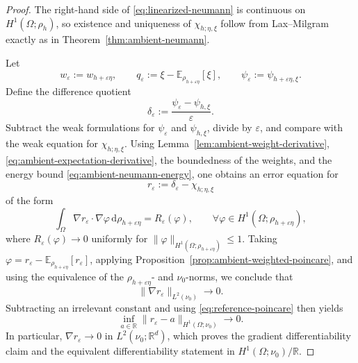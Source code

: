 \documentclass{article}
\theoremstyle{definition}
\renewcommand{\d}{\mathrm{d}}
\begin{document}
\begin{proof}
    The right-hand side of \eqref{eq:linearized-neumann} is continuous on
    \(H^1(\Omega;\rho_h)\), so existence and uniqueness of \(\chi_{h;\eta,\xi}\) follow from
    Lax--Milgram exactly as in Theorem~\ref{thm:ambient-neumann}.

    Let
    \[
        w_\varepsilon:=w_{h+\varepsilon\eta},
        \qquad
        q_\varepsilon:=\xi-\mathbb E_{\rho_{h+\varepsilon\eta}}[\xi],
        \qquad
        \psi_\varepsilon:=\psi_{h+\varepsilon\eta,\xi}.
    \]
    Define the difference quotient
    \[
        \delta_\varepsilon
        :=
        \frac{\psi_\varepsilon-\psi_{h,\xi}}{\varepsilon}.
    \]
    Subtract the weak formulations for \(\psi_\varepsilon\) and \(\psi_{h,\xi}\), divide by
    \(\varepsilon\), and compare with the weak equation for \(\chi_{h;\eta,\xi}\). Using
    Lemma~\ref{lem:ambient-weight-derivative}, \eqref{eq:ambient-expectation-derivative},
    the boundedness of the weights, and the energy bound
    \eqref{eq:ambient-neumann-energy}, one obtains an error equation for
    \[
        r_\varepsilon:=\delta_\varepsilon-\chi_{h;\eta,\xi}
    \]
    of the form
    \[
        \int_\Omega \nabla r_\varepsilon\cdot\nabla\varphi\,\d\rho_{h+\varepsilon\eta}
        =
        R_\varepsilon(\varphi),
        \qquad
        \forall \varphi\in H^1(\Omega;\rho_{h+\varepsilon\eta}),
    \]
    where \(R_\varepsilon(\varphi)\to 0\) uniformly for \(\|\varphi\|_{H^1(\Omega;\rho_{h+\varepsilon\eta})}\le 1\).
    Taking \(\varphi=r_\varepsilon-\mathbb E_{\rho_{h+\varepsilon\eta}}[r_\varepsilon]\), applying
    Proposition~\ref{prop:ambient-weighted-poincare}, and using the equivalence of the
    \(\rho_{h+\varepsilon\eta}\)- and \(\nu_0\)-norms, we conclude that
    \[
        \|\nabla r_\varepsilon\|_{L^2(\nu_0)}\to 0.
    \]
    Subtracting an irrelevant constant and using \eqref{eq:reference-poincare} then yields
    \[
        \inf_{a\in\mathbb R}
        \|r_\varepsilon-a\|_{H^1(\Omega;\nu_0)}
        \to 0.
    \]
    In particular, \(\nabla r_\varepsilon\to 0\) in \(L^2(\nu_0;\mathbb R^d)\), which proves the
    gradient differentiability claim and the equivalent differentiability statement in
    \(H^1(\Omega;\nu_0)/\mathbb R\).
\end{proof}
\end{document}
